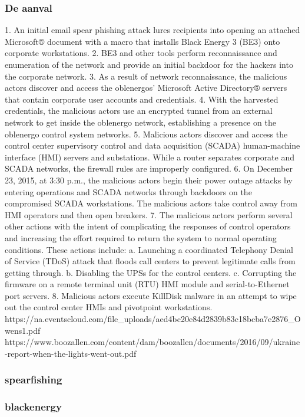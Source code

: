 \subsubsection{De aanval}
1. An initial email spear phishing attack lures recipients
into opening an attached Microsoft® document with a
macro that installs Black Energy 3 (BE3) onto
corporate workstations.
2. BE3 and other tools perform reconnaissance and
enumeration of the network and provide an initial
backdoor for the hackers into the corporate network.
3. As a result of network reconnaissance, the malicious
actors discover and access the oblenergos’ Microsoft
Active Directory® servers that contain corporate user
accounts and credentials.
4. With the harvested credentials, the malicious actors use
an encrypted tunnel from an external network to get
inside the oblenergo network, establishing a presence
on the oblenergo control system networks.
5. Malicious actors discover and access the control center
supervisory control and data acquisition (SCADA)
human-machine interface (HMI) servers and
substations. While a router separates corporate and
SCADA networks, the firewall rules are improperly
configured.
6. On December 23, 2015, at 3:30 p.m., the malicious
actors begin their power outage attacks by entering
operations and SCADA networks through backdoors on
the compromised SCADA workstations. The malicious
actors take control away from HMI operators and then
open breakers.
7. The malicious actors perform several other actions with
the intent of complicating the responses of control
operators and increasing the effort required to return the
system to normal operating conditions. These actions
include:
a. Launching a coordinated Telephony Denial of
Service (TDoS) attack that floods call centers to
prevent legitimate calls from getting through.
b. Disabling the UPSs for the control centers.
c. Corrupting the firmware on a remote terminal unit
(RTU) HMI module and serial-to-Ethernet port
servers.
8. Malicious actors execute KillDisk malware in an
attempt to wipe out the control center HMIs and pivotpoint workstations.
https://na.eventscloud.com/file_uploads/aed4bc20e84d2839b83c18bcba7e2876_Owens1.pdf
https://www.boozallen.com/content/dam/boozallen/documents/2016/09/ukraine-report-when-the-lights-went-out.pdf
\subsubsection{spearfishing}
\subsubsection{blackenergy}
